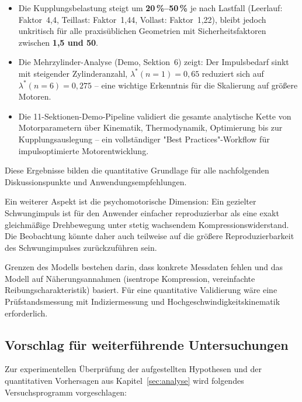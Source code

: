 ﻿\documentclass[a4paper,12pt]{article}
\begin{document}
\begin{itemize}
    Praxisanwendungen und validierbar durch Vergleich mit Demo-Ergebnissen.
  \item Die Kupplungsbelastung steigt um \textbf{20\,\%--50\,\%} je nach
    Lastfall (Leerlauf: Faktor~4{,}4, Teillast: Faktor~1{,}44, Vollast:
    Faktor~1{,}22), bleibt jedoch unkritisch für alle praxisüblichen Geometrien
    mit Sicherheitsfaktoren zwischen \textbf{1{,}5 und 50}.
  \item Die Mehrzylinder-Analyse (Demo, Sektion~6) zeigt: Der Impulsbedarf
    sinkt mit steigender Zylinderanzahl, $\lambda^*(n=1) = 0{,}65$ reduziert
    sich auf $\lambda^*(n=6) = 0{,}275$ -- eine wichtige Erkenntnis für die
    Skalierung auf größere Motoren.
  \item Die 11-Sektionen-Demo-Pipeline validiert die gesamte analytische
    Kette von Motorparametern über Kinematik, Thermodynamik, Optimierung bis
    zur Kupplungsauslegung -- ein vollständiger "Best Practices"-Workflow
    für impulsoptimierte Motorentwicklung.
\end{itemize}

Diese Ergebnisse bilden die quantitative Grundlage für alle nachfolgenden
Diskussionspunkte und Anwendungsempfehlungen.

Ein weiterer Aspekt ist die psychomotorische Dimension: Ein gezielter Schwungimpuls
ist für den Anwender einfacher reproduzierbar als eine exakt gleichmäßige Drehbewegung
unter stetig wachsendem Kompressionswiderstand. Die Beobachtung könnte daher auch
teilweise auf die größere Reproduzierbarkeit des Schwungimpulses zurückzuführen sein.

Grenzen des Modells bestehen darin, dass konkrete Messdaten fehlen und das Modell
auf Näherungsannahmen (isentrope Kompression, vereinfachte Reibungscharakteristik)
basiert. Für eine quantitative Validierung wäre eine Prüfstandsmessung mit
Indiziermessung und Hochgeschwindigkeitskinematik erforderlich.

\subsection{Vorschlag für weiterführende Untersuchungen}

Zur experimentellen Überprüfung der aufgestellten Hypothesen und der
quantitativen Vorhersagen aus Kapitel~\ref{sec:analyse} wird folgendes
Versuchsprogramm vorgeschlagen:
\end{document}
